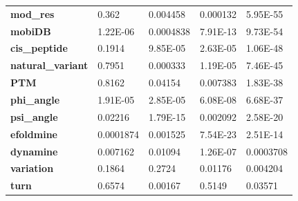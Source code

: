 \begin{table}[]
\begin{tabular}{@{}lllll@{}}
\textbf{mod\_res}             & \cellcolor[HTML]{F54D4D}0.362          & 0.004458                                 & 0.000132                               & 5.95E-55                               \\
\textbf{mobiDB}               & 1.22E-06                               & 0.0004838                                & 7.91E-13                               & 9.73E-54                               \\
\textbf{cis\_peptide}         & \cellcolor[HTML]{F54D4D}0.1914         & 9.85E-05                                 & 2.63E-05                               & 1.06E-48                               \\
\textbf{natural\_variant}     & \cellcolor[HTML]{F54D4D}0.7951         & 0.000333                                 & 1.19E-05                               & 7.46E-45                               \\
\textbf{PTM}                  & \cellcolor[HTML]{F54D4D}0.8162         & 0.04154                                  & 0.007383                               & 1.83E-38                               \\
\textbf{phi\_angle}           & 1.91E-05                               & 2.85E-05                                 & 6.08E-08                               & 6.68E-37                               \\
\textbf{psi\_angle}           & 0.02216                                & 1.79E-15                                 & 0.002092                               & 2.58E-20                               \\
\textbf{efoldmine}            & 0.0001874                              & 0.001525                                 & 7.54E-23                               & 2.51E-14                               \\
\textbf{dynamine}             & 0.007162                               & 0.01094                                  & 1.26E-07                               & 0.0003708                              \\
\textbf{variation}            & \cellcolor[HTML]{F54D4D}0.1864         & \cellcolor[HTML]{F54D4D}0.2724           & 0.01176                                & 0.004204                               \\
\textbf{turn}                 & \cellcolor[HTML]{F54D4D}0.6574         & 0.00167                                  & \cellcolor[HTML]{F54D4D}0.5149         & 0.03571                                \\

\end{tabular}
\end{table}
